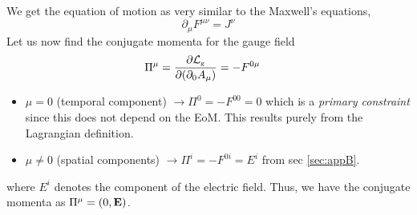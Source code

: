 We get the equation of motion as very similar to the Maxwell's equations,
\begin{equation}\label{eqn:eom}
    \boxed{\partial_\mu F^{\mu\nu} = J^\nu}
\end{equation}
Let us now find the conjugate momenta for the gauge field
\begin{align*}
    \Pi^\mu = \pdv{\mathcal L_{\text{\tiny g}}}{(\partial_0 A_\mu)} &= -F^{0\mu}
\end{align*}
\begin{itemize}
    \item[$\vartriangleright$] $\mu=0$ (temporal component)  $\longrightarrow \Pi^0 = -F^{00} = 0$ which is a \textit{primary constraint} since this does not depend on the EoM. This results purely from the Lagrangian definition. 
    \item[$\vartriangleright$] $\mu \neq 0$ (spatial components)  $\longrightarrow \Pi^i = -F^{0i} = E^i$ from sec \ref{sec:appB}.
\end{itemize} 
where $E^i$ denotes the component of the electric field. Thus, we have the conjugate momenta as $\Pi^\mu = (0,\vb{E})$.
